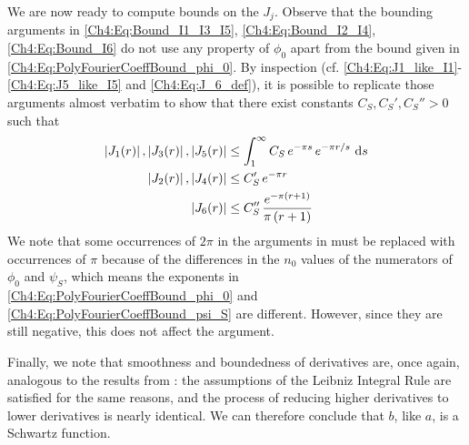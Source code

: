 We are now ready to compute bounds on the $J_j$. Observe that the bounding arguments in \eqref{Ch4:Eq:Bound_I1_I3_I5}, \eqref{Ch4:Eq:Bound_I2_I4}, \eqref{Ch4:Eq:Bound_I6} do not use any property of $\phi_0$ apart from the bound given in \eqref{Ch4:Eq:PolyFourierCoeffBound_phi_0}. By inspection (cf. \eqref{Ch4:Eq:J1_like_I1}-\eqref{Ch4:Eq:J5_like_I5} and \eqref{Ch4:Eq:J_6_def}), it is possible to replicate those arguments almost verbatim to show that there exist constants $C_S, C_S', C_S'' > 0$ such that
\begin{align}
    \left\lvert J_1(r) \right\rvert, \left\lvert J_3(r) \right\rvert, \left\lvert J_5(r) \right\rvert &\leq \int_{1}^{\infty} C_S \, e^{-\pi s} \, e^{- \pi r/s} \, \operatorname{d}\!{s} \label{Ch4:Eq:Bound_J1_J5} \\
    \left\lvert J_2(r) \right\rvert, \left\lvert J_4(r) \right\rvert &\leq C_S' \, e^{-\pi r} \label{Ch4:Eq:Bound_J_2} \\
    \left\lvert J_6(r) \right\rvert &\leq C_S'' \, \frac{e^{-\pi\left( r + 1 \right)}}{\pi\left( r + 1 \right)} \label{Ch4:Eq:Bound_J_6}
\end{align}
We note that some occurrences of $2\pi$ in the arguments in  must be replaced with occurrences of $\pi$ because of the differences in the $n_0$ values of the numerators of $\phi_0$ and $\psi_S$, which means the exponents in \eqref{Ch4:Eq:PolyFourierCoeffBound_phi_0} and \eqref{Ch4:Eq:PolyFourierCoeffBound_psi_S} are different. However, since they are still negative, this does not affect the argument.

Finally, we note that smoothness and boundedness of derivatives are, once again, analogous to the results from : the assumptions of the Leibniz Integral Rule are satisfied for the same reasons, and the process of reducing higher derivatives to lower derivatives is nearly identical. We can therefore conclude that $b$, like $a$, is a Schwartz function.